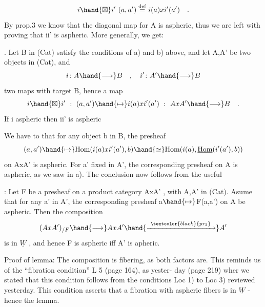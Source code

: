 \[ i\hand{\boxtimes}i'\ (a,a') \overset{\mathrm{def}}{=} i(a)xi'(a') \quad . \]
By prop.3 we know  that the diagonal map  for A is aspheric,  thus we
are left with proving that i\hand{\ensuremath{\boxtimes}}i' is aspheric.  More generally,  we get:

\hand{\uline{\textcolor{black}{Corollary}}}. Let B in (Cat)  satisfy the conditions of a) and b) above,
and let  A,A' be two objects in (Cat),  and
\[ i\colon A \hand{\longrightarrow} B \quad , \quad i'\colon A'\hand{\longrightarrow} B \]
two maps with target B,  hence a map
\[ i\hand{\boxtimes}i' \ : \ (a,a')\hand{\mapsto} i(a)xi'(a') \ : \ AxA' \hand{\longrightarrow} B \quad . \]
If  i  aspheric\hand{,}  then i\hand{\ensuremath{\boxtimes}}i' is
aspheric\hand{,}  

We have to   that for any object b in B,  the presheaf
 \[ (a,a')\hand{\mapsto} \mathrm{Hom}(i(a)xi'(a'),b) \hand{\simeq} \mathrm{Hom}(i(a), \underline{\mathrm{Hom}}(i'(a'),b)) \]
on AxA' is aspheric.  For a' fixed in A',  the corresponding presheaf
on A is aspheric,  as we saw in a).  The conclusion now follows from the
useful

\hand{\uline{\textcolor{black}{Lemma}}}:  Let F be a presheaf on a product category AxA' ,  with A,A' in
(Cat).  Asume that for any a' in A',  the corresponding presheaf
a$\hand{\mapsto}$F(a,a') on A be aspheric.  Then the composition
\[ (AxA')_{/F} \hand{\longrightarrow} AxA' \hand{\xrightarrow{\ \textcolor{black}{pr_2}\ }} A' \]
is in $\underline{W}$ ,  and hence F is aspheric iff A' is apheric.

Proof of lemma:  The composition is fibering, as both factors are.
This reminds us of the ``fibration condition'' L 5 (page 164),  as yester-%
day  (page 219)\hand{,} wher we stated that this condition follows from the
conditions Loc 1)  to Loc 3)  reviewed yesterday.  This condition asserts
that a fibration with aspheric fibers is in $\underline{W}$  -  hence the lemma.

